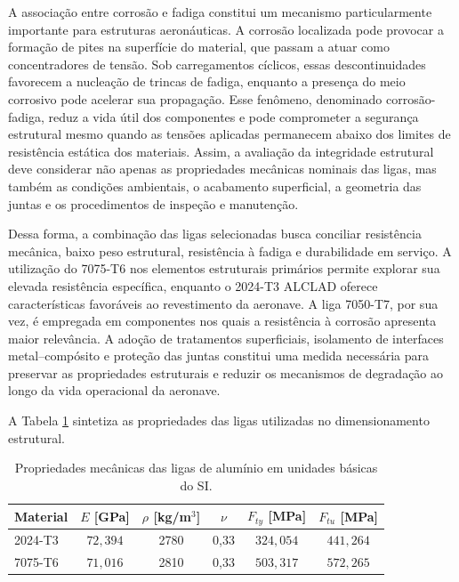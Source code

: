 A associação entre corrosão e fadiga constitui um mecanismo particularmente importante para estruturas aeronáuticas. A corrosão localizada pode provocar a formação de pites na superfície do material, que passam a atuar como concentradores de tensão. Sob carregamentos cíclicos, essas descontinuidades favorecem a nucleação de trincas de fadiga, enquanto a presença do meio corrosivo pode acelerar sua propagação. Esse fenômeno, denominado corrosão-fadiga, reduz a vida útil dos componentes e pode comprometer a segurança estrutural mesmo quando as tensões aplicadas permanecem abaixo dos limites de resistência estática dos materiais. Assim, a avaliação da integridade estrutural deve considerar não apenas as propriedades mecânicas nominais das ligas, mas também as condições ambientais, o acabamento superficial, a geometria das juntas e os procedimentos de inspeção e manutenção.

Dessa forma, a combinação das ligas selecionadas busca conciliar resistência mecânica, baixo peso estrutural, resistência à fadiga e durabilidade em serviço. A utilização do 7075-T6 nos elementos estruturais primários permite explorar sua elevada resistência específica, enquanto o 2024-T3 ALCLAD oferece características favoráveis ao revestimento da aeronave. A liga 7050-T7, por sua vez, é empregada em componentes nos quais a resistência à corrosão apresenta maior relevância. A adoção de tratamentos superficiais, isolamento de interfaces metal--compósito e proteção das juntas constitui uma medida necessária para preservar as propriedades estruturais e reduzir os mecanismos de degradação ao longo da vida operacional da aeronave.

A Tabela \ref{tab:propriedades_aluminio_si} sintetiza as propriedades das ligas utilizadas no dimensionamento estrutural.

\begin{table}[H]
\centering
\caption{Propriedades mecânicas das ligas de alumínio em unidades básicas do SI.}
\label{tab:propriedades_aluminio_si}
\begin{tabular}{|l|c|c|c|c|c|}
\hline
\textbf{Material} & \textbf{$E$ [GPa]} & \textbf{$\rho$ [kg/m$^3$]} & \textbf{$\nu$} & \textbf{$F_{ty}$ [MPa]} & \textbf{$F_{tu}$ [MPa]} \\ \hline
2024-T3 & $72,394$ & 2780 & 0,33 & $324,054$ & $441,264$ \\ \hline
7075-T6 & $71,016$ & 2810 & 0,33 & $503,317$ & $572,265$ \\ \hline
\end{tabular}
\end{table}

